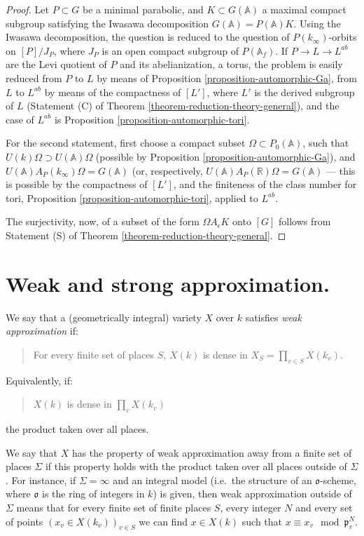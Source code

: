 \begin{proof}
Let $P\subset G$ be a minimal parabolic, and $K\subset G(\mathbb A)$ a maximal compact subgroup satisfying the Iwasawa decomposition $G(\mathbb A) = P(\mathbb A)K$. Using the Iwasawa decomposition, the question is reduced to the question of $P(k_\infty)$-orbits on $[P]/J_P$, where $J_P$ is an open compact subgroup of $P(\mathbb A_f)$. If $P\to L\to L^{ab}$ are the Levi quotient of $P$ and its abelianization, a torus, the problem is easily reduced from $P$ to $L$ by means of Proposition \ref{proposition-automorphic-Ga}, from $L$ to $L^{ab}$ by means of the compactness of $[L']$, where $L'$ is the derived subgroup of $L$ (Statement (C) of Theorem \ref{theorem-reduction-theory-general}), and the case of $L^{ab}$ is Proposition \ref{proposition-automorphic-tori}.

For the second statement, first choose a compact subset $\Omega\subset P_0(\mathbb A)$, such that $U(k)\Omega \supset U(\mathbb A)\Omega$ (possible by Proposition \ref{proposition-automorphic-Ga}), and $U(\mathbb A) A_P(k_\infty) \Omega = G(\mathbb A)$ (or, respectively, $U(\mathbb A) A_P(\mathbb R) \Omega = G(\mathbb A)$ --- this is possible by the compactness of $[L']$, and the finiteness of the class number for tori, Proposition \ref{proposition-automorphic-tori}, applied to $L^{ab}$.

The surjectivity, now, of a subset of the form $\Omega A_\epsilon K$ onto $[G]$ follows from Statement (S) of Theorem \ref{theorem-reduction-theory-general}.
\end{proof}



\section{Weak and strong approximation.}
\label{section-approximation}


\begin{definition}
 \label{definition-weak-approximation}
We say that a (geometrically integral) variety $X$ over $k$ satisfies {\it weak approximation} if:
\begin{quote}
 For every finite set of places $S$,  $X(k)$ is dense in $X_S=\prod_{v\in S} X(k_v)$.
\end{quote}
Equivalently, if:
\begin{quote}
 $X(k)$ is dense in $\prod_v X(k_v)$
\end{quote}
the product taken over all places. 

We say that $X$ has the property of weak approximation away from a finite set of places $\Sigma$ if this property holds with the product taken over all places outside of $\Sigma$. For instance, if $\Sigma=\infty$ and an integral model (i.e.\ the structure of an $\mathfrak o$-scheme, where $\mathfrak o$ is the ring of integers in $k$) is given, then weak approximation outside of $\Sigma$ means that for every finite set of finite places $S$, every integer $N$ and every set of points $(x_v \in X(k_v))_{v\in S}$ we can find $x\in X(k)$ such that $x\equiv x_v \mod \mathfrak p_v^N$.
\end{definition}

